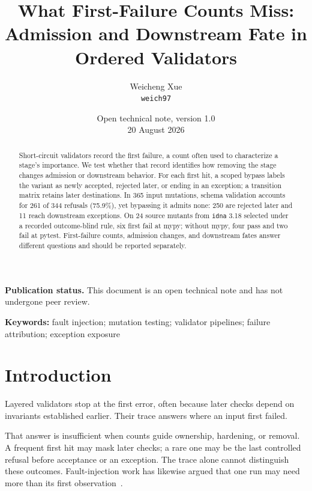 \documentclass[11pt]{article}
\begin{document}
\title{What First-Failure Counts Miss: Admission and Downstream Fate in Ordered Validators}
\author{Weicheng Xue\\[0.25em]\small\texttt{weich97}}
\date{\small Open technical note, version 1.0\\20 August 2026}

\maketitle
\thispagestyle{technicalnote}

\begin{center}
  \begin{minipage}{0.88\linewidth}
    \small
    \textbf{Publication status.}
    This document is an open technical note and has not undergone peer review.
  \end{minipage}
\end{center}

\begin{abstract}
Short-circuit validators record the first failure, a count often used to
characterize a stage's importance. We test whether that record identifies how
removing the stage changes admission or downstream behavior. For each first
hit, a scoped bypass labels the variant as newly accepted, rejected later, or
ending in an exception; a transition matrix retains later destinations. In 365
input mutations, schema validation accounts for 261 of 344 refusals (75.9\%),
yet bypassing it admits none: 250 are rejected later and 11 reach downstream
exceptions. On 24 source mutants from \texttt{idna} 3.18 selected under a
recorded outcome-blind rule, six first fail at mypy; without mypy, four pass and
two fail at pytest. First-failure counts, admission changes, and downstream fates answer
different questions and should be reported separately.
\end{abstract}

\noindent\textbf{Keywords:}
fault injection; mutation testing; validator pipelines; failure attribution;
exception exposure

\section{Introduction}

Layered validators stop at the first error, often because later checks depend
on invariants established earlier. Their trace answers where an input first
failed.

That answer is insufficient when counts guide ownership, hardening, or removal.
A frequent first hit may mask later checks; a rare one may be the last
controlled refusal before acceptance or an exception. The trace alone cannot
distinguish these outcomes. Fault-injection work has likewise argued that one
run may need more than its first observation~\cite{arlat2011collecting}.
\end{document}
